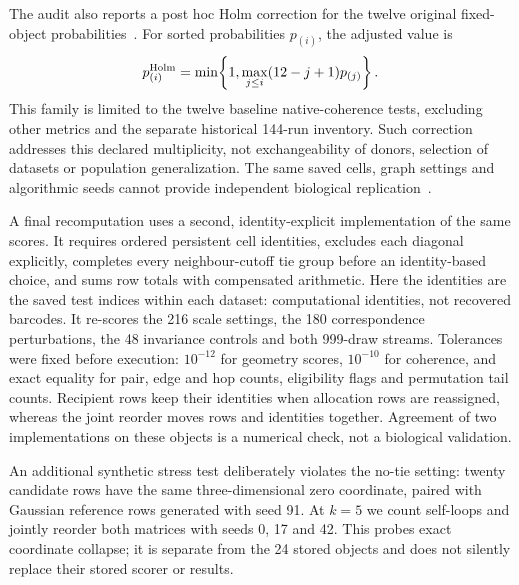\documentclass[11pt]{article}
\begin{document}
The audit also reports a post hoc Holm correction for the twelve original fixed-object probabilities~\cite{holm1979sequential}. For sorted probabilities $p_{(i)}$, the adjusted value is
\begin{equation}
 p^{\rm Holm}_{(i)}=\min\!\left\{1,\max_{j\leq i}(12-j+1)p_{(j)}\right\}.
\end{equation}
This family is limited to the twelve baseline native-coherence tests, excluding other metrics and the separate historical 144-run inventory. Such correction addresses this declared multiplicity, not exchangeability of donors, selection of datasets or population generalization. The same saved cells, graph settings and algorithmic seeds cannot provide independent biological replication~\cite{zimmerman2021pseudoreplication}.

A final recomputation uses a second, identity-explicit implementation of the same scores. It requires ordered persistent cell identities, excludes each diagonal explicitly, completes every neighbour-cutoff tie group before an identity-based choice, and sums row totals with compensated arithmetic. Here the identities are the saved test indices within each dataset: computational identities, not recovered barcodes. It re-scores the 216 scale settings, the 180 correspondence perturbations, the 48 invariance controls and both 999-draw streams. Tolerances were fixed before execution: $10^{-12}$ for geometry scores, $10^{-10}$ for coherence, and exact equality for pair, edge and hop counts, eligibility flags and permutation tail counts. Recipient rows keep their identities when allocation rows are reassigned, whereas the joint reorder moves rows and identities together. Agreement of two implementations on these objects is a numerical check, not a biological validation.

An additional synthetic stress test deliberately violates the no-tie setting: twenty candidate rows have the same three-dimensional zero coordinate, paired with Gaussian reference rows generated with seed 91. At $k=5$ we count self-loops and jointly reorder both matrices with seeds 0, 17 and 42. This probes exact coordinate collapse; it is separate from the 24 stored objects and does not silently replace their stored scorer or results.
\end{document}
